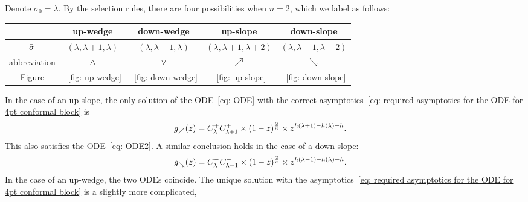 \documentclass[oneside,english]{amsart}
\numberwithin{equation}{section}
\numberwithin{figure}{section}
\theoremstyle{plain}
\theoremstyle{plain}
\theoremstyle{plain}
\theoremstyle{remark}
\theoremstyle{plain}
\theoremstyle{plain}
\theoremstyle{plain}
\theoremstyle{plain}
\theoremstyle{plain}
\theoremstyle{plain}
\theoremstyle{plain}
\theoremstyle{plain}
\begin{document}
Denote $\sigma_{0}=\lambda$. %
By the selection rules, there are %
four possibilities when $n=2$, which we label as follows:~
\begin{center}
\begin{tabular}{c|cccc}
 &
 \textbf{up-wedge}  \qquad  &
 \textbf{down-wedge}  \qquad &
 \textbf{up-slope}  \qquad &
 \textbf{down-slope}  \qquad \\
\hline
$\bar{\sigma}$ &
 $(\lambda,\lambda+1,\lambda)$ &
 $(\lambda,\lambda-1,\lambda)$ &
 $(\lambda,\lambda+1,\lambda+2)$ &
 $(\lambda,\lambda-1,\lambda-2)$ \\
abbreviation &
 $\wedge$ &
 $\vee$ &
 $\nearrow$ &
 $\searrow$ \\
Figure &
~\ref{fig: up-wedge} &
~\ref{fig: down-wedge} &
~\ref{fig: up-slope} &
~\ref{fig: down-slope} \\
\end{tabular}
\smallskip
\end{center}
%
In the case of an up-slope, the only solution of the %
ODE~\eqref{eq: ODE} with the correct asymptotics~\eqref{eq: required asymptotics for the ODE for 4pt conformal block} is
\begin{align*}
g_{\nearrow}(z)=\; & C_{\lambda}^{+}C_{\lambda+1}^{+}\times(1-z)^{\frac{2}{\kappa}}\times z^{h(\lambda+1)-h(\lambda)-h}.
\end{align*}
This also satisfies the ODE~\eqref{eq: ODE2}. A similar conclusion holds in the case of a down-slope:
\begin{align*}
g_{\searrow}(z)=\; & C_{\lambda}^{-}C_{\lambda-1}^{-}\times(1-z)^{\frac{2}{\kappa}}\times z^{h(\lambda-1)-h(\lambda)-h}.
\end{align*}
In the case of an up-wedge, the two ODEs coincide. The unique solution with the asymptotics~\eqref{eq: required asymptotics for the ODE for 4pt conformal block} is a slightly more complicated,
\end{document}
